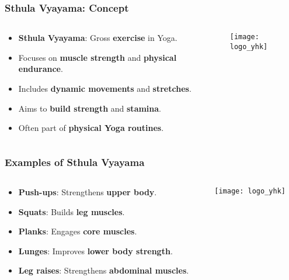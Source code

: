 \begin{frame}[fragile]\frametitle{Sthula Vyayama: Concept}
\begin{columns}
    \begin{column}[T]{0.5\linewidth}
      \begin{itemize}
        \item \textbf{Sthula Vyayama}: Gross \textbf{exercise} in Yoga.
        \item Focuses on \textbf{muscle strength} and \textbf{physical endurance}.
        \item Includes \textbf{dynamic movements} and \textbf{stretches}.
        \item Aims to \textbf{build strength} and \textbf{stamina}.
        \item Often part of \textbf{physical Yoga routines}.
      \end{itemize}
    \end{column}
    \begin{column}[T]{0.5\linewidth}
        \begin{center}
        \texttt{[image: logo\_yhk]}
        \end{center}	
    \end{column}
\end{columns}
\end{frame}

\begin{frame}[fragile]\frametitle{Examples of Sthula Vyayama}
\begin{columns}
    \begin{column}[T]{0.5\linewidth}
      \begin{itemize}
        \item \textbf{Push-ups}: Strengthens \textbf{upper body}.
        \item \textbf{Squats}: Builds \textbf{leg muscles}.
        \item \textbf{Planks}: Engages \textbf{core muscles}.
        \item \textbf{Lunges}: Improves \textbf{lower body strength}.
        \item \textbf{Leg raises}: Strengthens \textbf{abdominal muscles}.
      \end{itemize}
    \end{column}
    \begin{column}[T]{0.5\linewidth}
        \begin{center}
        \texttt{[image: logo\_yhk]}
        \end{center}	
    \end{column}
\end{columns}
\end{frame}

